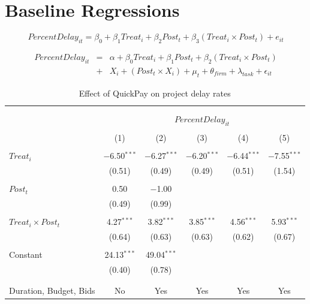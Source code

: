 \documentclass[]{article}
\begin{document}
\hypertarget{baseline-regressions}{%
\section{Baseline Regressions}\label{baseline-regressions}}

\[ PercentDelay_{it} = \beta_0 + \beta_1 Treat_i + \beta_2 Post_t + \beta_3 (Treat_i \times Post_t) + e_{it}\]

\[ \begin{aligned} PercentDelay_{it} &=& \alpha+\beta_0 Treat_i + \beta_1 Post_t + \beta_2 (Treat_i \times Post_t)\\
&+&  X_i + (Post_t \times X_i) + \mu_t + \theta_{firm} + \lambda_{task}+ \epsilon_{it}
\end{aligned}\]

\begin{table}[H] \centering 
  \caption{Effect of QuickPay on project delay rates} 
  \label{} 
\small 
\begin{tabular}{@{\extracolsep{-2pt}}lccccc} 
\\[-1.8ex]\hline 
\hline \\[-1.8ex] 
\\[-1.8ex] & \multicolumn{5}{c}{$PercentDelay_{it}$} \\ 
\\[-1.8ex] & (1) & (2) & (3) & (4) & (5)\\ 
\hline \\[-1.8ex] 
 $Treat_i$ & $-$6.50$^{***}$ & $-$6.27$^{***}$ & $-$6.20$^{***}$ & $-$6.44$^{***}$ & $-$7.55$^{***}$ \\ 
  & (0.51) & (0.49) & (0.49) & (0.51) & (1.54) \\ 
  & & & & & \\ 
 $Post_t$ & 0.50 & $-$1.00 &  &  &  \\ 
  & (0.49) & (0.99) &  &  &  \\ 
  & & & & & \\ 
 $Treat_i \times Post_t$ & 4.27$^{***}$ & 3.82$^{***}$ & 3.85$^{***}$ & 4.56$^{***}$ & 5.93$^{***}$ \\ 
  & (0.64) & (0.63) & (0.63) & (0.62) & (0.67) \\ 
  & & & & & \\ 
 Constant & 24.13$^{***}$ & 49.04$^{***}$ &  &  &  \\ 
  & (0.40) & (0.78) &  &  &  \\ 
  & & & & & \\ 
\hline \\[-1.8ex] 
Duration, Budget, Bids & No & Yes & Yes & Yes & Yes \\ 

\end{tabular}
\end{table}
\end{document}
